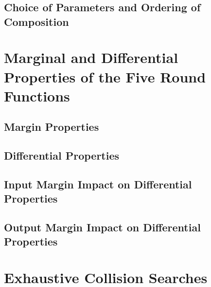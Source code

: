 \documentclass[10pt,twocolumn,twoside]{pnas-new}
\begin{document}


\subsection{Choice of Parameters and Ordering of Composition} \label{sec:p:generalizations}


\section{Marginal and Differential Properties of the Five Round Functions} \label{sec:differentials}


\subsection{Margin Properties} \label{sec:d:margin}


\subsection{Differential Properties} \label{sec:d:diff}


\subsection{Input Margin Impact on Differential Properties} \label{sec:d:input}


\subsection{Output Margin Impact on Differential Properties} \label{sec:d:output}



\section{Exhaustive Collision Searches} \label{sec:search}
\end{document}
